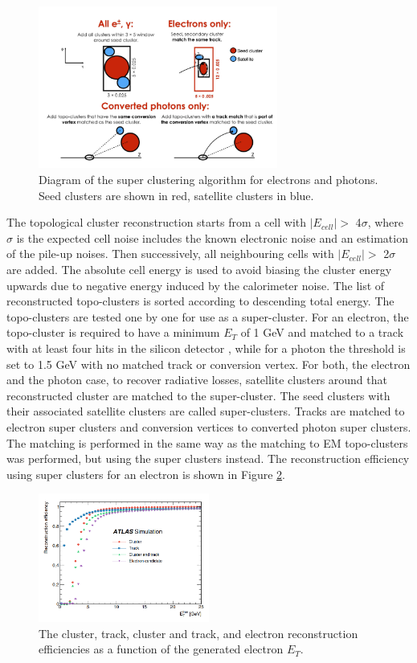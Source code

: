 \begin{figure}[htbp]
    \centering
    \includegraphics[width=0.7\textwidth]{Ch2/Img/Super_cluster.png}
    \caption{Diagram of the super clustering algorithm for electrons and photons. Seed clusters are shown in red, satellite clusters in blue.}
    \label{fig:chap2:Objetcs:Egamma:SC}
\end{figure}
The topological cluster reconstruction starts from a cell with $|E_{cell}|>$ 4$\sigma$, where $\sigma$ is the expected cell noise includes the known electronic noise and an estimation of the pile-up noises. Then successively, all neighbouring cells with $|E_{cell}|>$ 2$\sigma$ are added. The absolute cell energy is used to avoid biasing the cluster energy upwards due to negative energy induced by the calorimeter noise. The list of reconstructed topo-clusters is sorted according to descending total energy. The topo-clusters are tested one by one for use as a super-cluster. For an electron, the topo-cluster is required to have a minimum $E_T$ of 1 GeV and matched to a track with at least four hits in the silicon detector \cite{GSF}, while for a photon the threshold is set to 1.5 GeV with no matched track or conversion vertex. For both, the electron and the photon case, to recover radiative losses, satellite clusters around that reconstructed cluster are matched to the super-cluster. The seed clusters with their associated satellite clusters are called super-clusters. Tracks are matched to electron super clusters and conversion vertices to converted photon super clusters. The matching is performed in the same way as the matching to EM topo-clusters was performed, but using the super clusters instead. The reconstruction efficiency using super clusters for an electron is shown in Figure \ref{fig:chap2:Objects:Egamma:El_Eff}.
\begin{figure}[htbp]
    \centering
    \includegraphics[width=0.5\textwidth]{Ch2/Img/Electron_Reco_Eff.png}
    \caption{The cluster, track, cluster and track, and electron reconstruction efficiencies as a function of the generated electron $E_T$.}
    \label{fig:chap2:Objects:Egamma:El_Eff}
\end{figure}
